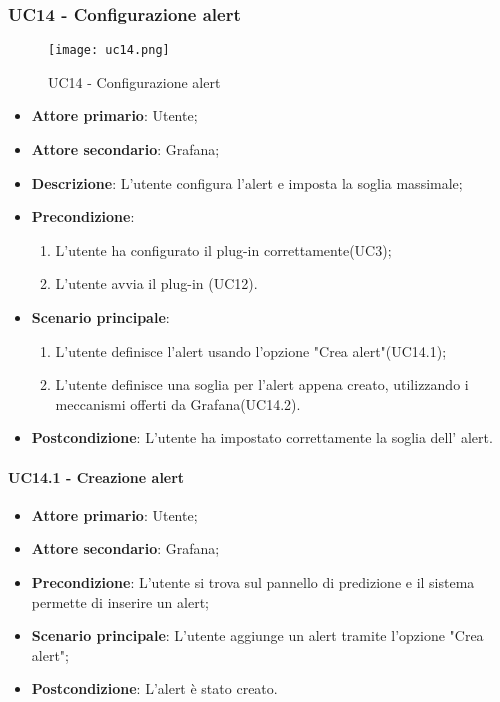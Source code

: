 \subsubsection{UC14 - Configurazione alert}
\label{sssec:uc14}

\begin{figure}[h!]
  \begin{center}
    \texttt{[image: uc14.png]}\\
    \caption{UC14 - Configurazione alert}%
    \label{fig:uc14}
  \end{center}
  \end{figure}

\begin{itemize}
  \item \textbf{Attore primario}: Utente;
  \item \textbf{Attore secondario}: Grafana;
  \item \textbf{Descrizione}: L'utente configura l'alert e imposta la soglia massimale;
  \item \textbf{Precondizione}:
  \begin{enumerate}
		\item L'utente ha configurato il plug-in correttamente(UC3);
		\item L'utente avvia il plug-in (UC12).
	\end {enumerate}
  \item \textbf{Scenario principale}:
  \begin{enumerate}
    \item L'utente definisce l'alert usando l'opzione "Crea alert"(UC14.1);
    \item L'utente definisce una soglia per l'alert appena creato, utilizzando i meccanismi offerti da Grafana(UC14.2).
  \end{enumerate}
  \item \textbf{Postcondizione}: L'utente ha impostato correttamente la soglia dell' alert.
\end{itemize}


\paragraph{UC14.1 - Creazione alert}
\label{para:uc14.1}
\begin{itemize}
  \item \textbf{Attore primario}: Utente;
  \item \textbf{Attore secondario}: Grafana;
  \item \textbf{Precondizione}: L'utente si trova sul pannello di predizione e il sistema permette di inserire un alert;
  \item \textbf{Scenario principale}: L'utente aggiunge un alert tramite l'opzione "Crea alert";
  \item \textbf{Postcondizione}: L'alert è stato creato.
\end{itemize}


